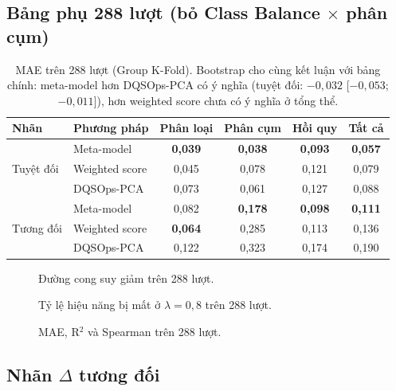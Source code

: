 \subsection{Bảng phụ 288 lượt (bỏ Class Balance $\times$ phân cụm)}

\begin{table}[ht]
\centering
\small
\begin{tabular}{@{}llcccc@{}}
\toprule
Nhãn & Phương pháp & Phân loại & Phân cụm & Hồi quy & Tất cả \\
\midrule
\multirow{3}{*}{Tuyệt đối} & Meta-model & \textbf{0,039} & \textbf{0,038} & \textbf{0,093} & \textbf{0,057} \\
 & Weighted score & 0,045 & 0,078 & 0,121 & 0,079 \\
 & DQSOps-PCA & 0,073 & 0,061 & 0,127 & 0,088 \\
\midrule
\multirow{3}{*}{Tương đối} & Meta-model & 0,082 & \textbf{0,178} & \textbf{0,098} & \textbf{0,111} \\
 & Weighted score & \textbf{0,064} & 0,285 & 0,113 & 0,136 \\
 & DQSOps-PCA & 0,122 & 0,323 & 0,174 & 0,190 \\
\bottomrule
\end{tabular}
\caption{MAE trên 288 lượt (Group K-Fold). Bootstrap cho cùng kết luận với bảng chính: meta-model hơn DQSOps-PCA có ý nghĩa (tuyệt đối: $-0{,}032$ [$-0{,}053$; $-0{,}011$]), hơn weighted score chưa có ý nghĩa ở tổng thể.}
\end{table}

\begin{figure}[ht]
\centering
{}
\caption{Đường cong suy giảm trên 288 lượt.}
\end{figure}

\begin{figure}[ht]
\centering
{}
\caption{Tỷ lệ hiệu năng bị mất ở $\lambda = 0{,}8$ trên 288 lượt.}
\end{figure}

\begin{figure}[ht]
\centering
{}
\caption{MAE, R$^2$ và Spearman trên 288 lượt.}
\end{figure}

\subsection{Nhãn $\Delta$ tương đối}

